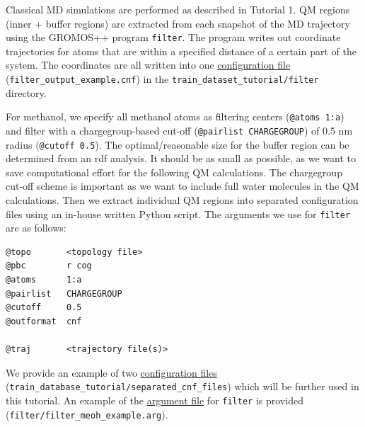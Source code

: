 Classical MD simulations are performed as described in Tutorial 1. QM regions (inner + buffer regions) are extracted from each snapshot of the MD trajectory using the GROMOS++ program \texttt{filter}. The program writes out coordinate trajectories for atoms that are within a specified distance of a certain part of the system. The coordinates are all written into one \href{https://github.com/LierB/gromos_tutorial_livecoms/blob/burnn_tutorial_rc/tutorial_files/t_06/train_dataset_tutorial/filter/filter_output_example.cnf}{configuration file} (\texttt{filter\_output\_example.cnf}) in the \texttt{train\_dataset\_tutorial/filter} directory.

For methanol, we specify all methanol atoms as filtering centers (\texttt{@atoms 1:a}) and filter with a chargegroup-based cut-off (\texttt{@pairlist CHARGEGROUP}) of 0.5 nm radius (\texttt{@cutoff 0.5}). The optimal/reasonable size for the buffer region can be determined from an rdf analysis. It should be as small as possible, as we want to save computational effort for the following QM calculations. The chargegroup cut-off scheme is important as we want to include full water molecules in the QM calculations. Then we extract individual QM regions into separated configuration files using an in-house written Python script. The arguments we use for \texttt{filter} are as follows:

\begin{lstlisting}[breaklines=true, breakatwhitespace=false]
@topo       <topology file>
@pbc        r cog
@atoms      1:a
@pairlist   CHARGEGROUP
@cutoff     0.5
@outformat  cnf

@traj       <trajectory file(s)>
\end{lstlisting}

We provide an example of two \href{https://github.com/LierB/gromos_tutorial_livecoms/tree/burnn_tutorial_rc/tutorial_files/t_06/train_dataset_tutorial/separated_cnf_files}{configuration files} (\texttt{train\_database\_tutorial/separated\_cnf\_files}) which will be further used in this tutorial. An example of the \href{https://github.com/LierB/gromos_tutorial_livecoms/blob/burnn_tutorial_rc/tutorial_files/t_06/train_dataset_tutorial/filter/filter_meoh_example.arg}{argument file} for \texttt{filter} is provided (\texttt{filter/filter\_meoh\_example.arg}).

